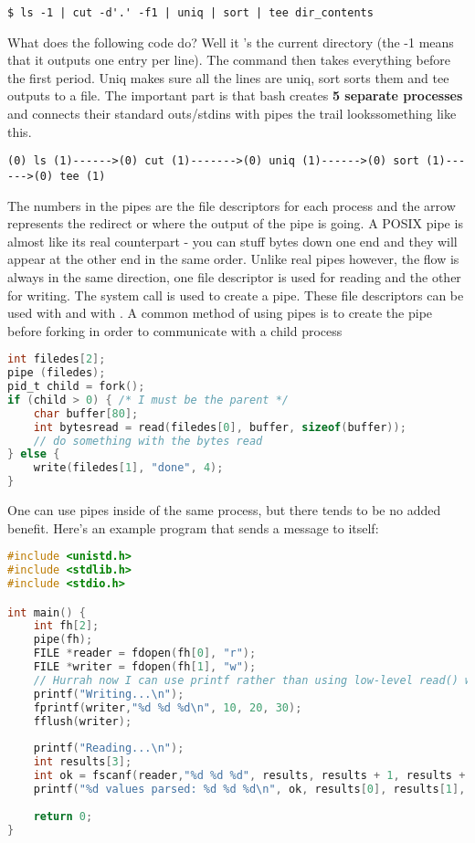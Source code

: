 \begin{verbatim}
$ ls -1 | cut -d'.' -f1 | uniq | sort | tee dir_contents
\end{verbatim}

What does the following code do? Well it 's the current directory (the -1 means that it outputs one entry per line). The  command then takes everything before the first period. Uniq makes sure all the lines are uniq, sort sorts them and tee outputs to a file. The important part is that bash creates \textbf{5 separate processes} and connects their standard outs/stdins with pipes the trail lookssomething like this.

\begin{verbatim}
(0) ls (1)------>(0) cut (1)------->(0) uniq (1)------>(0) sort (1)------>(0) tee (1)
\end{verbatim}

The numbers in the pipes are the file descriptors for each process and the arrow represents the redirect or where the output of the pipe is going. A POSIX pipe is almost like its real counterpart - you can stuff bytes down one end and they will appear at the other end in the same order. Unlike real pipes however, the flow is always in the same direction, one file descriptor is used for reading and the other for writing. The  system call is used to create a pipe. These file descriptors can be used with  and with . A common method of using pipes is to create the pipe before forking in order to communicate with a child process

\begin{lstlisting}[language=C]
int filedes[2];
pipe (filedes);
pid_t child = fork();
if (child > 0) { /* I must be the parent */
    char buffer[80];
    int bytesread = read(filedes[0], buffer, sizeof(buffer));
    // do something with the bytes read    
} else {
	write(filedes[1], "done", 4);
}
\end{lstlisting}

One can use pipes inside of the same process, but there tends to be no added benefit. Here's an example program that sends a message to itself:

\begin{lstlisting}[language=C]
#include <unistd.h>
#include <stdlib.h>
#include <stdio.h>

int main() {
    int fh[2];
    pipe(fh);
    FILE *reader = fdopen(fh[0], "r");
    FILE *writer = fdopen(fh[1], "w");
    // Hurrah now I can use printf rather than using low-level read() write()
    printf("Writing...\n");
    fprintf(writer,"%d %d %d\n", 10, 20, 30);
    fflush(writer);
    
    printf("Reading...\n");
    int results[3];
    int ok = fscanf(reader,"%d %d %d", results, results + 1, results + 2);
    printf("%d values parsed: %d %d %d\n", ok, results[0], results[1], results[2]);
    
    return 0;
}
\end{lstlisting}

